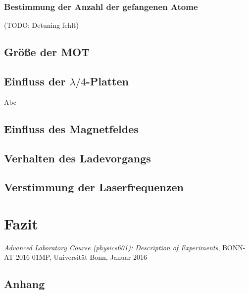 \documentclass[11pt, a4paper]{article}
\numberwithin{equation}{section}
\newcommand{\korr}[1]{{\color{red}(#1)}}
\begin{document}
\subsubsection{Bestimmung der Anzahl der gefangenen Atome}
\korr{TODO: Detuning fehlt}



\subsection{Größe der MOT}


\subsection{Einfluss der $\lambda / 4$-Platten}
Abc



\subsection{Einfluss des Magnetfeldes}


\subsection{Verhalten des Ladevorgangs}


\subsection{Verstimmung der Laserfrequenzen}






\section{Fazit}


\FloatBarrier
\vspace{\fill}
\begin{thebibliography}{19}
	\emph{Advanced Laboratory Course (physics601): Description of Experiments}, BONN-AT-2016-01MP, Universität Bonn, Januar 2016
\end{thebibliography}

\begin{appendix}
\newpage
\section{Anhang}
\end{appendix}
\end{document}
